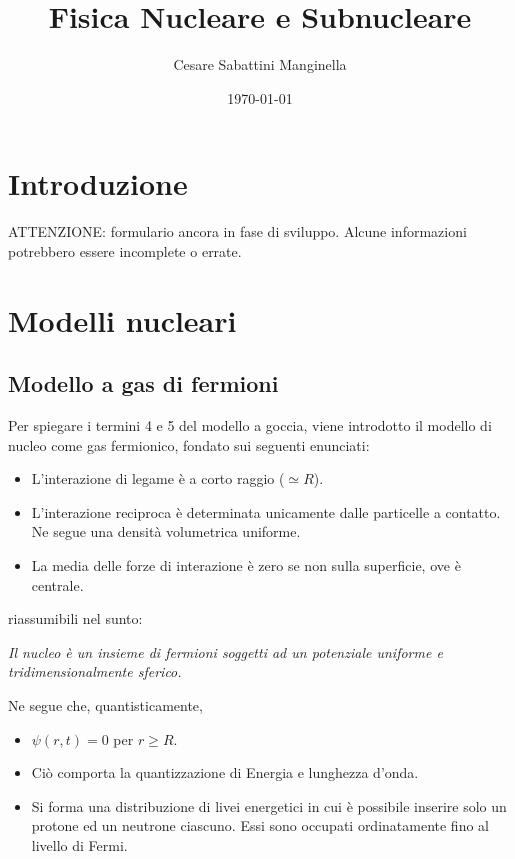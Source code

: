 \documentclass{article}
\title{Fisica Nucleare e Subnucleare}
\author{Cesare Sabattini Manginella}
\date{\today}
\begin{document}
\maketitle

\begin{abstract}

\end{abstract}


\section{Introduzione}
ATTENZIONE: formulario ancora in fase di sviluppo. Alcune informazioni potrebbero essere incomplete o errate.

\section{Modelli nucleari}
\subsection{Modello a gas di fermioni}
Per spiegare i termini 4 e 5 del modello a goccia, viene introdotto il modello di nucleo come gas fermionico,
fondato sui seguenti enunciati:
\begin{itemize}
    \item L'interazione di legame è a corto raggio ($\simeq R$).
    \item L'interazione reciproca è determinata unicamente dalle particelle a contatto. Ne segue una densità volumetrica uniforme.
    \item La media delle forze di interazione è zero se non sulla superficie, ove è centrale.
\end{itemize}

riassumibili nel sunto:

\emph{Il nucleo è un insieme di fermioni soggetti ad un potenziale uniforme e tridimensionalmente sferico.}

Ne segue che, quantisticamente,

\begin{itemize}
    \item $\psi(r, t)=0$ per $r\geq R$.
    \item Ciò comporta la quantizzazione di Energia e lunghezza d'onda.
    \item Si forma una distribuzione di livei energetici in cui è possibile inserire solo un protone ed un neutrone ciascuno. Essi sono
    occupati ordinatamente fino al livello di Fermi.
\end{itemize}
\end{document}
